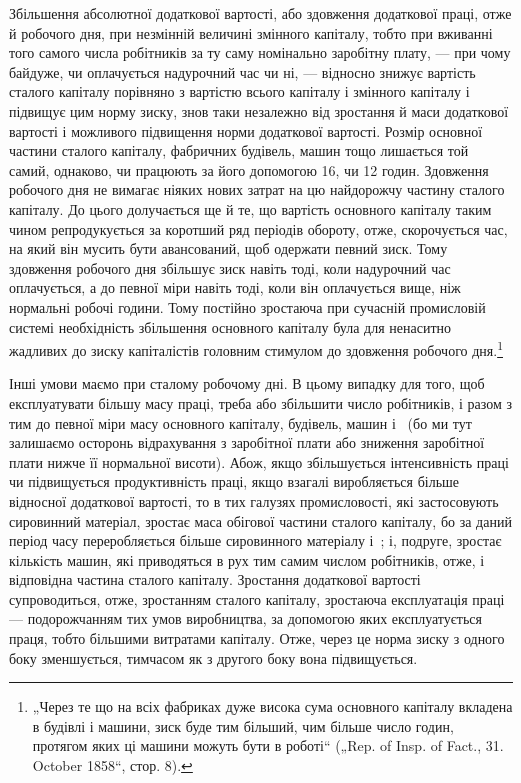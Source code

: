 Збільшення абсолютної додаткової вартості, або здовження
додаткової праці, отже й робочого дня, при незмінній величині
змінного капіталу, тобто при вживанні того самого числа робітників
за ту саму номінально заробітну плату, — при чому байдуже,
чи оплачується надурочний час чи ні, — відносно знижує
вартість сталого капіталу порівняно з вартістю всього капіталу
і змінного капіталу і підвищує цим норму зиску, знов таки
незалежно від зростання й маси додаткової вартості і можливого
підвищення норми додаткової вартості. Розмір основної
частини сталого капіталу, фабричних будівель, машин тощо лишається
той самий, однаково, чи працюють за його допомогою 16,
чи 12 годин. Здовження робочого дня не вимагає ніяких нових
затрат на цю найдорожчу частину сталого капіталу. До цього долучається
ще й те, що вартість основного капіталу таким чином репродукується
за коротший ряд періодів обороту, отже, скорочується
час, на який він мусить бути авансований, щоб одержати
певний зиск. Тому здовження робочого дня збільшує зиск навіть
тоді, коли надурочний час оплачується, а до певної міри навіть
тоді, коли він оплачується вище, ніж нормальні робочі години.
Тому постійно зростаюча при сучасній промисловій системі необхідність
збільшення основного капіталу була для ненаситно
жадливих до зиску капіталістів головним стимулом до здовження
робочого дня.\footnote{
„Через те що на всіх фабриках дуже висока сума основного капіталу
вкладена в будівлі і машини, зиск буде тим більший, чим більше число годин,
протягом яких ці машини можуть бути в роботі“ („Rep. of Insp. of Fact., 31.
October 1858“, стор. 8).
}

Інші умови маємо при сталому робочому дні. В цьому випадку
для того, щоб експлуатувати більшу масу праці, треба
або збільшити число робітників, і разом з тим до певної міри
масу основного капіталу, будівель, машин і~ (бо ми тут
залишаємо осторонь відрахування з заробітної плати або зниження
заробітної плати нижче її нормальної висоти). Абож, якщо
збільшується інтенсивність праці чи підвищується продуктивність
праці, якщо взагалі виробляється більше відносної додаткової
вартості, то в тих галузях промисловості, які застосовують
сировинний матеріал, зростає маса обігової частини
сталого капіталу, бо за даний період часу переробляється
більше сировинного матеріалу і~; і, подруге, зростає кількість
машин, які приводяться в рух тим самим числом робітників,
отже, і відповідна частина сталого капіталу. Зростання додаткової
вартості супроводиться, отже, зростанням сталого капіталу, зростаюча
експлуатація праці — подорожчанням тих умов виробництва,
за допомогою яких експлуатується праця, тобто більшими
витратами капіталу. Отже, через це норма зиску з одного
боку зменшується, тимчасом як з другого боку вона підвищується.

